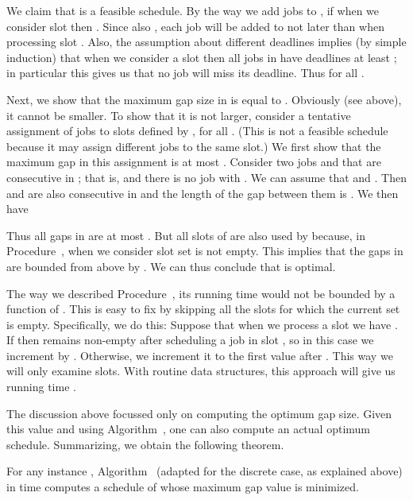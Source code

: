 We claim that  is a feasible schedule. By the way we add
jobs to , if  when we consider slot  then . Since also
, each job will be added to  not later than when processing slot .
Also, the assumption about different deadlines implies (by simple induction) that when we consider a slot  then all jobs in 
have deadlines at least ; in particular this gives us that no job will miss its deadline. 
Thus  for all .

Next, we show that the maximum gap size in  is equal to . Obviously (see above), it
cannot be smaller. To show that it is not larger, consider a tentative assignment  of jobs to
slots defined by , for all . (This is not a feasible schedule
because it may assign different jobs to the same slot.) We first show that the
maximum gap in this assignment is at most . Consider two jobs  and  that are consecutive in ;
that is,  and there is no job  with .
We can assume that  and
. Then  and  are also consecutive in  and
the length of the gap between them is . We then have

Thus all gaps in  are at most . But all slots of  are also used by 
because, in Procedure~, when we consider slot  set  is not empty.
This implies that the gaps in  are bounded from above by . We can thus conclude that  is optimal.  

The way we described Procedure~, its running time would not be bounded by a function of .
This is easy to fix by skipping all the slots  for which the current set  is empty. Specifically,
we do this: Suppose that when we process a slot  we have . If  then  remains non-empty
after scheduling a job in slot , so in this case we increment  by . Otherwise, we increment it to the
first value  after . This way we will only examine  slots.
With routine data structures, this approach will give us running time .

The discussion above focussed only on computing the optimum gap size. Given this value
and using Algorithm~, one can also compute an actual optimum schedule. Summarizing, we obtain the following theorem.



\begin{theorem}\label{thm: min max gap}
For any instance , Algorithm~ (adapted for the discrete case, as explained above)
in time  computes a schedule of  whose maximum gap value is minimized. 
\end{theorem}




